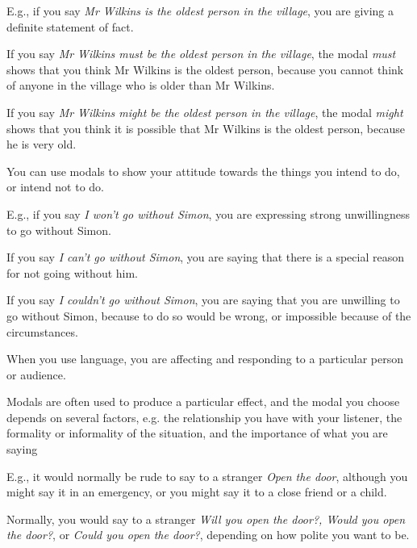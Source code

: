 \documentclass[oneside]{book}
\numberwithin{equation}{section}
\begin{document}
%
E.g., if you say \textit{Mr Wilkins is the oldest person in the village}, you are giving a definite statement of fact.

If you say \textit{Mr Wilkins must be the oldest person in the village}, the modal \textit{must} shows that you think Mr Wilkins is the oldest person, because you cannot think of anyone in the village who is older than Mr Wilkins.

If you say \textit{Mr Wilkins might be the oldest person in the village}, the modal \textit{might} shows that you think it is possible that Mr Wilkins is the oldest person, because he is very old.

%
\noindent{} You can use modals to show your attitude towards the things you intend to do, or intend not to do.

E.g., if you say \textit{I won't go without Simon}, you are expressing strong unwillingness to go without Simon.

If you say \textit{I can't go without Simon}, you are saying that there is a special reason for not going without him.

If you say \textit{I couldn't go without Simon}, you are saying that you are unwilling to go without Simon, because to do so would be wrong, or impossible because of the circumstances.

%
\noindent{} When you use language, you are affecting and responding to a particular person or audience.

Modals are often used to produce a particular effect, and the modal you choose depends on several factors, e.g. the relationship you have with your listener, the formality or informality of the situation, and the importance of what you are saying

%
E.g., it would normally be rude to say to a stranger \textit{Open the door}, although you might say it in an emergency, or you might say it to a close friend or a child.

Normally, you would say to a stranger \textit{Will you open the door?, Would you open the door?}, or \textit{Could you open the door?}, depending on how polite you want to be.
\end{document}
